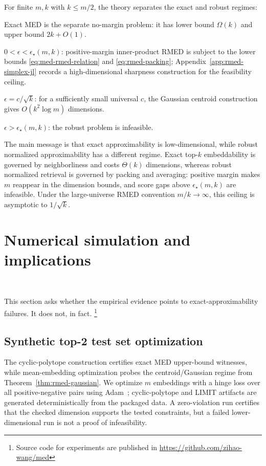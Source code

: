 \documentclass{article}
\begin{document}
For finite $m,k$ with $k\leq m/2$, the theory separates the exact and robust regimes:
\begin{compactitem}
    \item Exact MED is the separate no-margin problem: it has lower bound $\Omega(k)$ and upper bound $2k+O(1)$.
    \item $0<\epsilon<\epsilon_\star(m,k)$: positive-margin inner-product RMED is subject to the lower bounds \eqref{eq:med-rmed-relation} and \eqref{eq:rmed-packing}; Appendix~\ref{app:rmed-simplex-jl} records a high-dimensional sharpness construction for the feasibility ceiling.
    \item $\epsilon=c/\sqrt{k}$: for a sufficiently small universal $c$, the Gaussian centroid construction gives $O(k^2\log m)$ dimensions.
    \item $\epsilon>\epsilon_\star(m,k)$: the robust problem is infeasible.
\end{compactitem}
The main message is that exact approximability is low-dimensional, while robust normalized approximability has a different regime. Exact top-$k$ embeddability is governed by neighborliness and costs $\Theta(k)$ dimensions, whereas robust normalized retrieval is governed by packing and averaging: positive margin makes $m$ reappear in the dimension bounds, and score gaps above $\epsilon_\star(m,k)$ are infeasible. Under the large-universe RMED convention $m/k\to\infty$, this ceiling is asymptotic to $1/\sqrt{k}$.
\section{Numerical simulation and implications}~\label{sec:maed_and_exp}

This section asks whether the empirical evidence points to exact-approximability failures. It does not, in fact. \footnote{Source code for experiments are published in \url{https://github.com/zihao-wang/med}}

\subsection{Synthetic top-2 test set optimization}
The cyclic-polytope construction certifies exact MED upper-bound witnesses, while mean-embedding optimization probes the centroid/Gaussian regime from Theorem~\ref{thm:rmed-gaussian}. We optimize $m$ embeddings with a hinge loss over all positive-negative pairs using Adam~\citep{kingma2014adam}; cyclic-polytope and LIMIT artifacts are generated deterministically from the packaged data. A zero-violation run certifies that the checked dimension supports the tested constraints, but a failed lower-dimensional run is not a proof of infeasibility.
\end{document}
